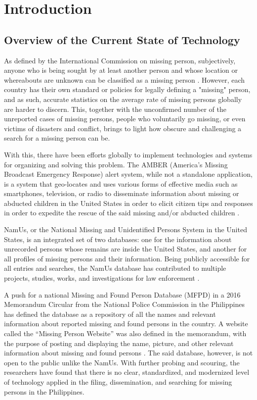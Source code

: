 \chapter{Introduction}
\label{sec:researchdesc}    %

\section{Overview of the Current State of Technology}
\label{sec:overview}
As defined by the International Commission on missing person, subjectively, anyone who is being sought by at least another person and whose location or whereabouts are unknown can be classified as a missing person \cite{icmpMissing}. However, each country has their own standard or policies for legally defining a "missing" person, and as such, accurate statistics on the average rate of missing persons globally are harder to discern. This, together with the unconfirmed number of the unreported cases of missing persons, people who voluntarily go missing, or even victims of disasters and conflict, brings to light how obscure and challenging a search for a missing person can be.

With this, there have been efforts globally to implement technologies and systems for organizing and solving this problem. The AMBER (America's Missing Broadcast Emergency Response) alert system, while not a standalone application, is a system that geo-locates and uses various forms of effective media such as smartphones, television, or radio to disseminate information about missing or abducted children in the United States in order to elicit citizen tips and responses in order to expedite the rescue of the said missing and/or abducted children \cite{griffin2007preliminary}.

NamUs, or the National Missing and Unidentified Persons System in the United States, is an integrated set of two databases: one for the information about unrecorded persons whose remains are inside the United States, and another for all profiles of missing persons and their information. Being publicly accessible for all entries and searches, the NamUs database has contributed to multiple projects, studies, works, and investigations for law enforcement \cite{murray2018history}. 

A push for a national Missing and Found Person Database (MFPD) in a 2016 Memorandum Circular from the National Police Commission in the Philippines has defined the database as a repository of all the names and relevant information about reported missing and found persons in the country. A website called the “Missing Person Website” was also defined in the memorandum, with the purpose of posting and displaying the name, picture, and other relevant information about missing and found persons \cite{NationalPoliceCommission}. The said database, however, is not open to the public unlike the NamUs. With further probing and scouring, the researchers have found that there is no clear, standardized, and modernized level of technology applied in the filing, dissemination, and searching for missing persons in the Philippines.

